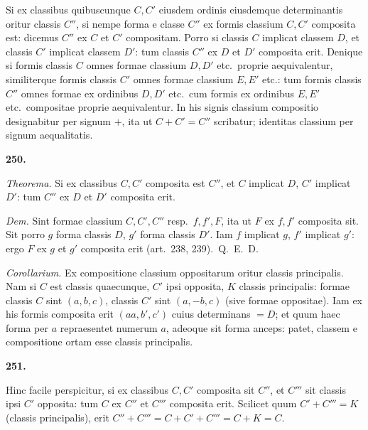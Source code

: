 \documentclass[12pt,a4paper]{article}
\theoremstyle{plain}
\theoremstyle{definition}
\theoremstyle{remark}
\begin{document}
Si ex classibus quibuscunque $C, C'$ eiusdem ordinis eiusdemque determinantis oritur classis $C''$, si nempe forma e classe $C''$ ex formis classium $C, C'$ composita est: dicemus $C''$ ex $C$ et $C'$ compositam. Porro si classis $C$ implicat classem $D$, et classis $C'$ implicat classem $D'$: tum classis $C''$ ex $D$ et $D'$ composita erit. Denique si formis classis $C$ omnes formae classium $D, D'$ etc.\ proprie aequivalentur, similiterque formis classis $C'$ omnes formae classium $E, E'$ etc.: tum formis classis $C''$ omnes formae ex ordinibus $D, D'$ etc.\ cum formis ex ordinibus $E, E'$ etc.\ compositae proprie aequivalentur. In his signis classium compositio designabitur per signum $+$, ita ut $C + C' = C''$ scribatur; identitas classium per signum aequalitatis.


\begin{center}\textbf{250.}\end{center}

\textit{Theorema.} Si ex classibus $C, C'$ composita est $C''$, et $C$ implicat $D$, $C'$ implicat $D'$: tum $C''$ ex $D$ et $D'$ composita erit.

\textit{Dem.} Sint formae classium $C, C', C''$ resp.\ $f, f', F$, ita ut $F$ ex $f, f'$ composita sit. Sit porro $g$ forma classis $D$, $g'$ forma classis $D'$. Iam $f$ implicat $g$, $f'$ implicat $g'$: ergo $F$ ex $g$ et $g'$ composita erit (art.\ 238, 239).\ Q.\ E.\ D.

\textit{Corollarium.} Ex compositione classium oppositarum oritur classis principalis. Nam si $C$ est classis quaecunque, $C'$ ipsi opposita, $K$ classis principalis: formae classis $C$ sint $(a,b,c)$, classis $C'$ sint $(a,-b,c)$ (sive formae oppositae). Iam ex his formis composita erit $(aa, b', c')$ cuius determinans $= D$; et quum haec forma per $a$ repraesentet numerum $a$, adeoque sit forma anceps: patet, classem e compositione ortam esse classis principalis.

\begin{center}\textbf{251.}\end{center}

Hinc facile perspicitur, si ex classibus $C, C'$ composita sit $C''$, et $C'''$ sit classis ipsi $C'$ opposita: tum $C$ ex $C''$ et $C'''$ composita erit. Scilicet quum $C' + C''' = K$ (classis principalis), erit $C'' + C''' = C + C' + C''' = C + K = C$.
\end{document}
